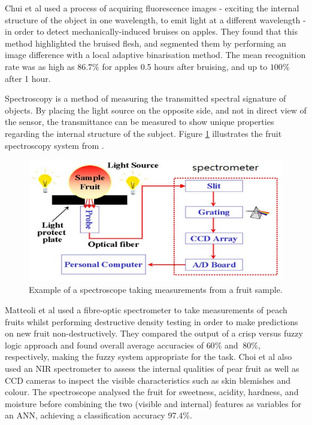 \documentclass[fleqn,twoside,12pt]{report}
\begin{document}
Chui et al \cite{chiu} used a process of acquiring fluorescence images - exciting the internal structure of the object in one wavelength, to emit light at a different wavelength - in order to detect mechanically-induced bruises on apples. They found that this method highlighted the bruised flesh, and segmented them by performing an image difference with a local adaptive binarisation method. The mean recognition rate was as high as $86.7\%$ for apples 0.5 hours after bruising, and up to $100\%$ after 1 hour.


Spectroscopy is a method of measuring the transmitted spectral signature of objects. By placing the light source on the opposite side, and not in direct view of the sensor, the transmittance can be measured to show unique properties regarding the internal structure of the subject. Figure \ref{fig:spectroscope} illustrates the fruit spectroscopy system from \cite{choi}. 

\begin{figure}[h]
	\centering
	\includegraphics[width=0.7\linewidth]{spectroscope.png}
	\caption{Example of a spectroscope taking measurements from a fruit sample.}
	\label{fig:spectroscope}
\end{figure}%


Matteoli et al \cite{matteoli} used a fibre-optic spectrometer to take measurements of peach fruits whilst performing destructive density testing in order to make predictions on new fruit non-destructively. They compared the output of a crisp versus fuzzy logic approach and found overall average accuracies of $60\%$ and $~80\%$, respectively, making the fuzzy system appropriate for the task. Choi et al \cite{choi} also used an NIR spectrometer to assess the internal qualities of pear fruit as well as CCD cameras to inspect the visible characteristics such as skin blemishes and colour. The spectroscope analysed the fruit for sweetness, acidity, hardness, and moisture before combining the two (visible and internal) features as variables for an ANN, achieving a classification accuracy $97.4\%$.
\end{document}
